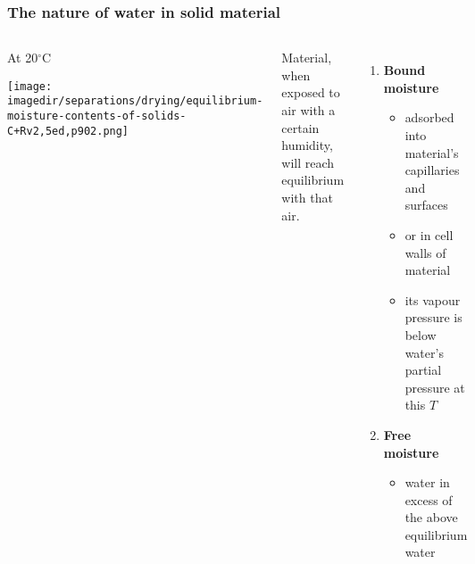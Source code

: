 \begin{frame}\frametitle{The nature of water in solid material}
	\begin{columns}[c]
			\begin{center}
				At 20$^\circ\text{C}$
				
				\texttt{[image: \\imagedir/separations/drying/equilibrium-moisture-contents-of-solids-C+Rv2,5ed,p902.png]}
			\end{center}
			\vspace{-12pt}
			Material, when exposed to air with a certain humidity, will reach equilibrium with that air.
			
			\vspace{12pt}
			\begin{enumerate}
				\item	\textbf{Bound moisture}
				\begin{itemize}
					\item	adsorbed into material's capillaries and surfaces
					\item	or in cell walls of material
					\item	its vapour pressure is below water's partial pressure at this $T$
				\end{itemize}
				\item	\textbf{Free moisture}
				\begin{itemize}
					\item	water in excess of the above equilibrium water
				\end{itemize}
			\end{enumerate}
	\end{columns}
\end{frame}

